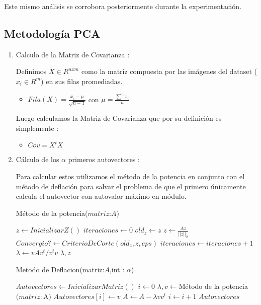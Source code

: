 Este mismo análisis se corrobora posteriormente durante la experimentación.

\subsection{Metodología PCA}

 \begin{enumerate}
     \item Calculo de la Matriz de Covarianza :
     
Definimos $X \in R^{nxm}$ como la matriz compuesta por las imágenes del dataset ($x_i \in R^{m}$) en sus filas promediadas. 
\par

\begin{itemize}
	\item $Fila(X) =  \frac{x_i - \mu}{\sqrt{n-1}}$  con $\mu =\frac{\sum^{n} x_i}{n} $
\end{itemize}

Luego calculamos la Matriz de Covarianza que por su definición es simplemente :
\begin{itemize}
	\item $Cov=  X^{t}X $
\end{itemize}

\item Cálculo de los $\alpha$ primeros autovectores : 

Para calcular estos utilizamos el método de la potencia en conjunto con el método de deflación para salvar el problema de que el primero únicamente calcula el autovector con autovalor máximo en módulo.

\begin{algorithm}[H]
\caption{Método de la potencia($matriz$:$A$)}
\begin{algorithmic}[H]
    \State $z \leftarrow InicializarZ()$
    \State $iteraciones \leftarrow 0$
        \State $old_z \leftarrow z$
        \State $z \leftarrow \frac{Az}{||z ||_2}$
        \State $Convergio? \leftarrow CriterioDeCorte(old_z,z,eps)$
        \State $iteraciones \leftarrow iteraciones +1$
    \EndWhile  
    \State $\lambda \leftarrow vAv^t/v^tv$
    \State
    \Return  $\lambda,z$
\end{algorithmic}
\end{algorithm}

\begin{algorithm}[H]
\caption{Metodo de Deflacion(matriz:$A$,int : $\alpha$)}
\begin{algorithmic}[H]
    \State $Autovectores \leftarrow InicializarMatriz()$
    \State $i \leftarrow 0$
        \State $\lambda,v \leftarrow $Método de la potencia$(matriz:$A$)$
        \State $Autovectores[i] \leftarrow v$
        \State $A \leftarrow A - \lambda vv^t$
        \State $i \leftarrow i +1$
    \EndWhile  
    \State
    \Return  $Autovectores$
\end{algorithmic}
\end{algorithm}


\end{enumerate}
